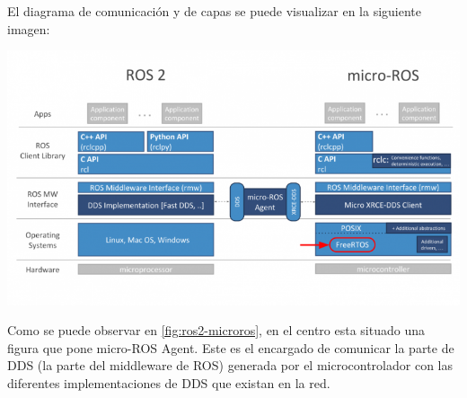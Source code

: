 El diagrama de comunicación y de capas se puede visualizar en la siguiente imagen:

\begin{center}
    \centering
    \includegraphics[width=\textwidth]{img/02-micro-ros.png}
    \label{fig:ros2-microros}
\end{center}

Como se puede observar en \ref{fig:ros2-microros}, en el centro esta situado una figura que pone micro-ROS Agent. Este es el encargado de comunicar la parte de DDS (la parte del middleware de ROS) generada por el microcontrolador con las diferentes implementaciones de DDS que existan en la red.